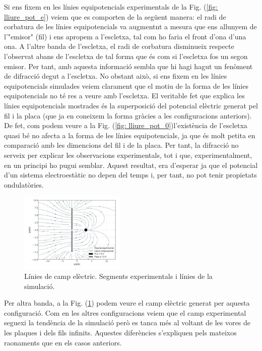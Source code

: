 \documentclass[11pt]{article}
\begin{document}
Si ens fixem en les línies equipotencials experimentals de la Fig. (\ref{fig: lliure_pot_e}) veiem que es comporten de la següent manera: el radi de corbatura de les línies equipotencials va augmentnt a mesura que ens allunyem de l'"emisor" (fil) i ens apropem a l'escletxa, tal com ho faria el front d'ona d'una ona. A l'altre banda de l'escletxa, el radi de corbatura disminueix respecte l'observat abans de l'escletxa de tal forma que és com si l'escletxa fos un segon emisor. Per tant, amb aquesta informació sembla que hi hagi hagut un fenòment de difracció degut a l'escletxa.
No obstant això, si ens fixem en les línies equipotencials simulades veiem clarament que el motiu de la forma de les línies equipotencials no té res a veure amb l'escletxa. El veritable fet que explica les línies equipotencials mostrades és la superposició del potencial elèctric generat pel fil i la placa (que ja en coneixem la forma gràcies a les configuracions anteriors). De fet, com podem veure a la Fig. (\ref{fig: lliure_pot_0})l'existència de l'escletxa quasi bé no afecta a la forma de les línies equipotencials, ja que és molt petita en comparació amb les dimencions del fil i de la placa. Per tant, la difracció no serveix per explicar les observacions experimentals, tot i que, experimentalment, en un principi ho pugui semblar. Aquest resultat, era d'esperar ja que el potencial d'un sistema electroestàtic no depen del temps i, per tant, no pot tenir propietats ondulatòries.
\begin{figure}
    \centering
    \includegraphics[width=0.45\textwidth]{lliure_camp.pdf}
    \caption{Línies de camp elèctric. Segments experimentals i línies de la simulació.}
    \label{fig: lliure_camp}
\end{figure}

Per altra banda, a la Fig. (\ref{fig: lliure_camp}) podem veure el camp elèctric generat per aquesta configuració. Com en les altres configuracions veiem que el camp experimental seguexi la tendència de la simulació però es tanca més al voltant de les vores de les plaques i dels fils infinits. Aquestes diferències s'expliquen pels mateixos raonaments que en els casos anteriors.
\end{document}
